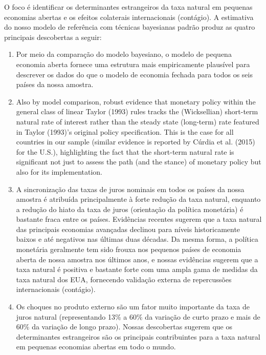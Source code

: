 O foco é identificar os determinantes estrangeiros da taxa natural em pequenas economias abertas e os efeitos colaterais internacionais (contágio). A estimativa do nosso modelo de referência com técnicas bayesianas padrão produz as quatro principais descobertas a seguir:
\begin{enumerate}
    \item Por meio da comparação do modelo bayesiano, o modelo de pequena economia aberta fornece uma estrutura mais empiricamente plausível para descrever os dados do que o modelo de economia fechada para todos os seis países da nossa amostra.
    
    \item Also by model comparison, robust evidence that monetary policy within the general class of linear Taylor (1993) rules tracks the (Wicksellian) short-term natural rate of interest rather than the steady state (long-term) rate featured in Taylor (1993)’s original policy specification. This is the case for all countries in our sample (similar evidence is reported by Cúrdia et al. (2015) for the U.S.), highlighting the fact that the short-term natural rate is significant not just to assess the path (and the stance) of monetary policy but also for its implementation.
    
    \item A sincronização das taxas de juros nominais em todos os países da nossa amostra é atribuída principalmente à forte redução da taxa natural, enquanto a redução do hiato da taxa de juros (orientação da política monetária) é bastante fraca entre os países. Evidências recentes sugerem que a taxa natural das principais economias avançadas declinou para níveis historicamente baixos e até negativos nas últimas duas décadas. Da mesma forma, a política monetária geralmente tem sido frouxa nos pequenos países de economia aberta de nossa amostra nos últimos anos, e nossas evidências sugerem que a taxa natural é positiva e bastante forte com uma ampla gama de medidas da taxa natural dos EUA, fornecendo validação externa de repercussões internacionais (contágio).
    
    \item Os choques no produto externo são um fator muito importante da taxa de juros natural (representando 13$\%$ a 60$\%$ da variação de curto prazo e mais de 60$\%$ da variação de longo prazo). Nossas descobertas sugerem que os determinantes estrangeiros são os principais contribuintes para a taxa natural em pequenas economias abertas em todo o mundo.
    
\end{enumerate}

